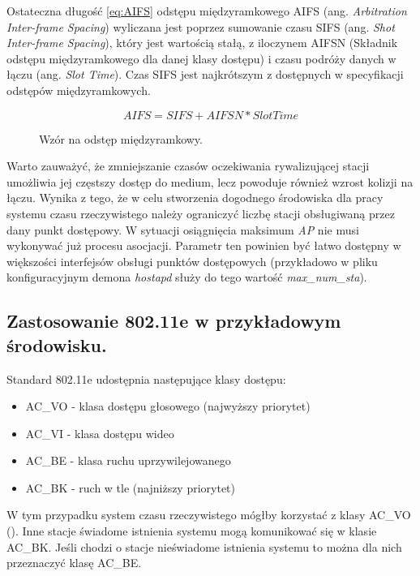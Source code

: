 Ostateczna długość \eqref{eq:AIFS} odstępu międzyramkowego AIFS (ang. \emph{Arbitration Inter-frame Spacing}) wyliczana jest poprzez sumowanie czasu SIFS (ang. \emph{Shot Inter-frame Spacing}), który jest wartością stałą, z iloczynem AIFSN (Składnik odstępu międzyramkowego dla danej klasy dostępu) i czasu podróży danych w łączu (ang. \emph{Slot Time}). Czas SIFS jest najkrótszym z dostępnych w specyfikacji odstępów międzyramkowych.    

\begin{figure}
\caption{Wzór na odstęp międzyramkowy.}
\begin{equation} 
\label{eq:AIFS}
AIFS = SIFS + AIFSN * Slot Time 
\end{equation}
\end{figure}

Warto zauważyć, że zmniejszanie czasów oczekiwania rywalizującej stacji umożliwia jej częstszy
dostęp do medium, lecz powoduje również wzrost kolizji na łączu. Wynika z tego, że w celu stworzenia dogodnego środowiska dla pracy systemu czasu rzeczywistego należy ograniczyć liczbę stacji obsługiwaną przez dany punkt dostępowy. W sytuacji osiągnięcia maksimum \emph{AP} nie musi wykonywać już procesu asocjacji. Parametr ten powinien być łatwo dostępny w większości interfejsów obsługi punktów dostępowych (przykładowo w pliku konfiguracyjnym demona \emph{hostapd} służy do tego wartość \emph{max\_num\_sta}).

\subsection{Zastosowanie 802.11e w przykładowym środowisku.}

Standard 802.11e udostępnia następujące klasy dostępu:

\begin{itemize}
\item AC\_VO - klasa dostępu głosowego (najwyższy priorytet)
\item AC\_VI - klasa dostępu wideo
\item AC\_BE - klasa ruchu uprzywilejowanego 
\item AC\_BK - ruch w tle (najniższy priorytet)
\end{itemize}

W tym przypadku system czasu rzeczywistego mógłby korzystać z klasy AC\_VO (\cite{pub:802.11e}). Inne stacje świadome istnienia systemu mogą komunikować się w klasie AC\_BK. Jeśli chodzi o stacje nieświadome istnienia systemu to można dla nich przeznaczyć klasę AC\_BE.

